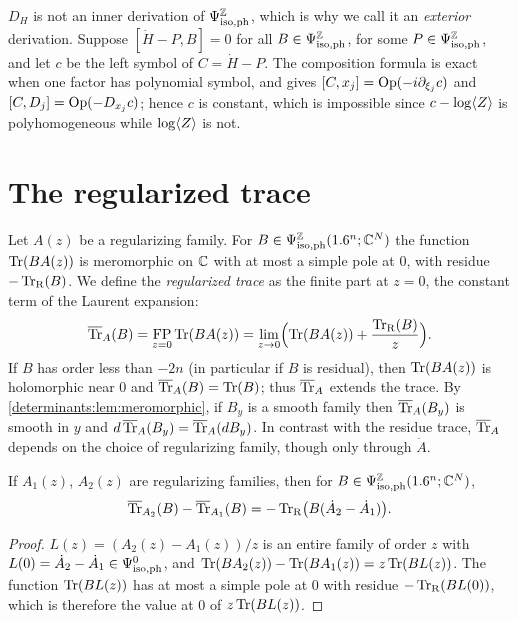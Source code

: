 \begin{remark}\label{determinants:rem:exterior}
  $D_H$ is not an inner derivation of $\Psi^{\mathbb{Z}}_{\mathrm{iso,ph}}$, which is why we call it
  an \emph{exterior} derivation. Suppose $[\dot H-P,B]=0$ for all
  $B\in\Psi^{\mathbb{Z}}_{\mathrm{iso,ph}}$, for some $P\in\Psi^{\mathbb{Z}}_{\mathrm{iso,ph}}$, and let $c$ be the left symbol
  of $C=\dot H-P$. The composition formula is exact when one factor has
  polynomial symbol, and gives $[C,x_j]=\operatorname{Op}(-i\partial_{\xi_j}c)$ and
  $[C,D_j]=\operatorname{Op}(-D_{x_j}c)$; hence $c$ is constant, which is impossible since
  $c-\log\langle Z\rangle$ is polyhomogeneous while $\log\langle Z\rangle$ is not.
\end{remark}

\section{The regularized trace}\label{determinants:sec:regularized}

Let $A(z)$ be a regularizing family. For $B\in\Psi^{\mathbb{Z}}_{\mathrm{iso,ph}}(1.6^n;\mathbb{C}^N)$ the
function $\operatorname{Tr}(BA(z))$ is meromorphic on $\mathbb{C}$ with at most a simple pole at $0$,
with residue $-\operatorname{Tr}_{\mathrm{R}}(B)$. We define the \emph{regularized trace} as the
finite part at $z=0$, the constant term of the Laurent expansion:
\begin{equation}\label{determinants:eq:regularized-trace}
  \overline{\operatorname{Tr}}_{A}(B)=\operatorname*{FP}_{z=0}\operatorname{Tr}(BA(z))=\lim_{z\to0}\Bigl(\operatorname{Tr}(BA(z))+\frac{\operatorname{Tr}_{\mathrm{R}}(B)}{z}\Bigr).
\end{equation}
If $B$ has order less than $-2n$ (in particular if $B$ is residual), then
$\operatorname{Tr}(BA(z))$ is holomorphic near $0$ and $\overline{\operatorname{Tr}}_{A}(B)=\operatorname{Tr}(B)$; thus $\overline{\operatorname{Tr}}_{A}$
extends the trace. By \cref{determinants:lem:meromorphic}, if $B_y$ is a
smooth family then $\overline{\operatorname{Tr}}_{A}(B_y)$ is smooth in $y$ and
$d\,\overline{\operatorname{Tr}}_{A}(B_y)=\overline{\operatorname{Tr}}_{A}(dB_y)$. In contrast with the residue trace,
$\overline{\operatorname{Tr}}_{A}$ depends on the choice of regularizing family, though only through
$\dot A$.

\begin{lemma}\label{determinants:lem:regularizer-change}
  If $A_1(z)$, $A_2(z)$ are regularizing families, then for
  $B\in\Psi^{\mathbb{Z}}_{\mathrm{iso,ph}}(1.6^n;\mathbb{C}^N)$,
  \begin{equation*}
    \overline{\operatorname{Tr}}_{A_2}(B)-\overline{\operatorname{Tr}}_{A_1}(B)=-\operatorname{Tr}_{\mathrm{R}}\bigl(B(\dot A_2-\dot A_1)\bigr).
  \end{equation*}
\end{lemma}
\begin{proof}
  $L(z)=(A_2(z)-A_1(z))/z$ is an entire family of order $z$ with
  $L(0)=\dot A_2-\dot A_1\in\Psi^{0}_{\mathrm{iso,ph}}$, and
  $\operatorname{Tr}(BA_2(z))-\operatorname{Tr}(BA_1(z))=z\operatorname{Tr}(BL(z))$. The function $\operatorname{Tr}(BL(z))$ has at
  most a simple pole at $0$ with residue $-\operatorname{Tr}_{\mathrm{R}}(BL(0))$, which is therefore
  the value at $0$ of $z\operatorname{Tr}(BL(z))$.
\end{proof}

